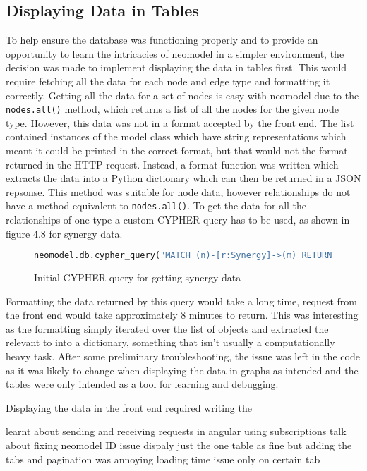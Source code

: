 \subsection{Displaying Data in Tables}
To help ensure the database was functioning properly and to provide an opportunity to learn the intricacies of neomodel in a simpler 
environment, the decision was made to implement displaying the data in tables first. This would require fetching all the data for each 
node and edge type and formatting it correctly. Getting all the data for a set of nodes is easy with neomodel due to the \verb|nodes.all()| method, 
which returns a list of all the nodes for the given node type. However, this data was not in a format accepted by the front end. The list contained 
instances of the model class which have string representations which meant it could be printed in the correct format, but that would not the format 
returned in the HTTP request. Instead, a format function was written which extracts the data into a Python dictionary which can then be returned in a JSON repsonse.
This method was suitable for node data, however relationships do not have a method equivalent to \verb|nodes.all()|. To get the data 
for all the relationships of one type a custom CYPHER query has to be used, as shown in figure 4.8 for synergy data.
\begin{figure}[H]
    \begin{lstlisting}[language=Python]
        neomodel.db.cypher_query("MATCH (n)-[r:Synergy]->(m) RETURN n, r, m")
    \end{lstlisting}
    \caption{Initial CYPHER query for getting synergy data}
\end{figure}
Formatting the data returned by this query would take a long time, request from the front end would take approximately 8 minutes to return.
This was interesting as the formatting simply iterated over the list of objects and extracted the relevant to into a dictionary, something that 
isn't usually a computationally heavy task. After some preliminary troubleshooting, the issue was left in the code as it was likely to change 
when displaying the data in graphs as intended and the tables were only intended as a tool for learning and debugging.

Displaying the data in the front end required writing the 

learnt about sending and receiving requests in angular
using subscriptions
talk about fixing neomodel ID issue
dispaly just the one table as fine but adding the tabs and pagination was annoying
loading time issue only on certain tab
